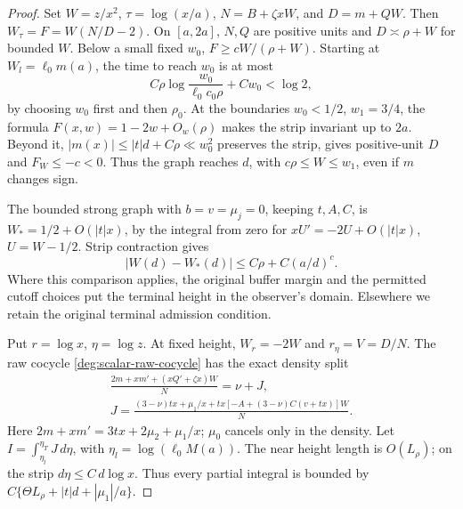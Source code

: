 \begin{proof}
Set \(W=z/x^2\), \(\tau=\log(x/a)\), \(N=B+\zeta xW\), and
\(D=m+QW\). Then \(W_\tau=F=W(N/D-2)\). On \([a,2a]\),
\(N,Q\) are positive units and \(D\asymp\rho+W\) for bounded \(W\).
Below a small fixed \(w_0\), \(F\ge cW/(\rho+W)\). Starting at
\(W_l=\ell_0m(a)\), the time to reach \(w_0\) is at most
\[
 C\rho\log\frac{w_0}{\ell_0c_0\rho}+Cw_0<\log2,
\]
by choosing \(w_0\) first and then \(\rho_0\). At the boundaries
\(w_0<1/2\), \(w_1=3/4\), the formula \(F(x,w)=1-2w+O_w(\rho)\)
makes the strip invariant up to \(2a\). Beyond it,
\(|m(x)|\le|t|d+C\rho\ll w_0^2\) preserves the strip, gives
positive-unit \(D\) and \(F_W\le-c<0\). Thus the graph reaches
\(d\), with \(c\rho\le W\le w_1\), even if \(m\) changes sign.

The bounded strong graph with \(b=v=\mu_j=0\), keeping \(t,A,C\),
is \(W_*=1/2+O(|t|x)\), by the integral from zero for
\(xU'=-2U+O(|t|x)\), \(U=W-1/2\). Strip contraction gives
\begin{equation}\label{deg:spectral-exterior-window}
 |W(d)-W_*(d)|\le C\rho+C(a/d)^c.
\end{equation}
Where this comparison applies, the original buffer margin and the
permitted cutoff choices put the terminal height in the observer's
domain. Elsewhere we retain the original terminal admission condition.

Put \(r=\log x\), \(\eta=\log z\). At fixed height, \(W_r=-2W\)
and \(r_\eta=V=D/N\). The raw cocycle
\eqref{deg:scalar-raw-cocycle} has the exact density split
\begin{equation}\label{deg:spectral-exterior-density}
 \begin{gathered}
 \frac{2m+xm'+(xQ'+\zeta x)W}{N}=\nu+J,\\
 J=\frac{(3-\nu)tx+\mu_1/x+
          tx[-A+(3-\nu)C(v+tx)]W}{N}.
 \end{gathered}
\end{equation}
Here \(2m+xm'=3tx+2\mu_2+\mu_1/x\); \(\mu_0\) cancels only
in the density. Let
\(I=\int_{\eta_l}^{\eta_T}J\,d\eta\), with
\(\eta_l=\log(\ell_0M(a))\). The near height length is \(O(L_\rho)\);
on the strip \(d\eta\le C\,d\log x\). Thus every partial integral
is bounded by \(C\{\Theta L_\rho+|t|d+|\mu_1|/a\}\).


\end{proof}
